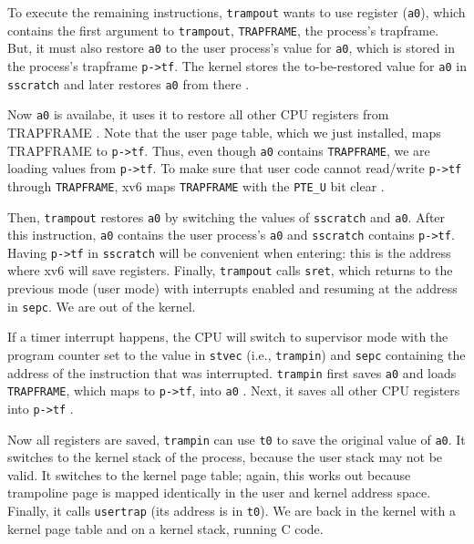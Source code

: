 To execute the remaining instructions, \lstinline{trampout} wants to
use register (\lstinline{a0}), which contains the first argument to
\lstinline{trampout}, \lstinline{TRAPFRAME}, the process's
trapframe. But, it must also restore \lstinline{a0} to the user
process's value for \lstinline{a0}, which is stored in the process's
trapframe \lstinline{p->tf}.  The kernel stores the to-be-restored value for
\lstinline{a0} in \lstinline{sscratch} and later restores
\lstinline{a0} from there .

Now \lstinline{a0} is availabe, it uses it to restore all other CPU
registers from TRAPFRAME .
Note that the user page table, which we just installed, maps
TRAPFRAME to \lstinline{p->tf}.  Thus, even though \lstinline{a0}
contains \lstinline{TRAPFRAME}, we are loading values from
\lstinline{p->tf}.  To make sure that user code cannot read/write
\lstinline{p->tf} through \lstinline{TRAPFRAME}, xv6 maps
\lstinline{TRAPFRAME} with the \lstinline{PTE_U} bit clear
.

Then, \lstinline{trampout} restores \lstinline{a0} by switching the
values of \lstinline{sscratch} and \lstinline{a0}. After this
instruction, \lstinline{a0} contains the user process's \lstinline{a0}
and \lstinline{sscratch} contains \lstinline{p->tf}.  Having
\lstinline{p->tf} in \lstinline{sscratch} will be convenient when
entering: this is the address where xv6 will save registers.  Finally,
\lstinline{trampout} calls \lstinline{sret}, which returns to the
previous mode (user mode) with interrupts enabled and resuming at the
address in \lstinline{sepc}.  We are out of the kernel.

If a timer interrupt happens, the CPU will switch to supervisor mode with
the program counter set to the value in \lstinline{stvec} (i.e.,
\lstinline{trampin}) and \lstinline{sepc} containing the address of
the instruction that was interrupted.  \lstinline{trampin} first saves
\lstinline{a0} and loads \lstinline{TRAPFRAME}, which maps to
\lstinline{p->tf}, into \lstinline{a0}
.
Next, it saves all other
CPU registers into \lstinline{p->tf}
.

Now all registers are saved, \lstinline{trampin} can
use \lstinline{t0} to save the original value of \lstinline{a0}.  It
switches to the kernel stack of the process, because the user stack
may not be valid.  It switches to the kernel page table; again, this
works out because trampoline page is mapped identically in the user
and kernel address space.  Finally, it calls \lstinline{usertrap} (its
address is in \lstinline{t0}).  We are back in the kernel with a
kernel page table and on a kernel stack, running C code.

